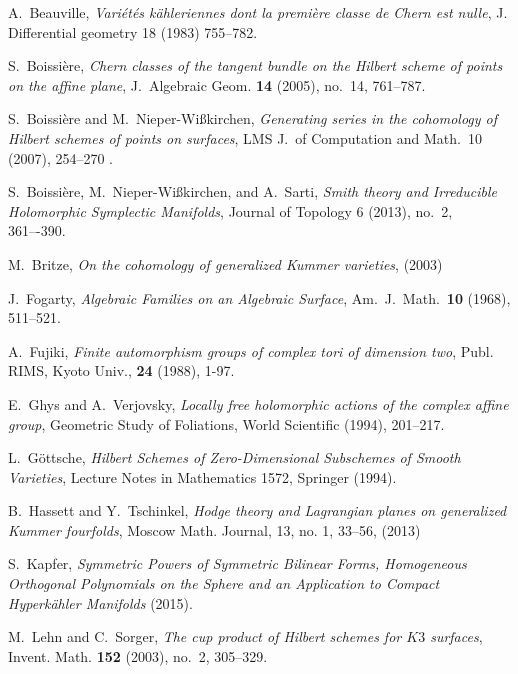 
\begin{thebibliography}{10}

A.~Beauville, \emph{Vari\'et\'es k\"ahleriennes dont la premi\`ere classe de Chern est nulle}, 
  J. Differential geometry 18 (1983) 755--782.

S.~Boissi\`ere, \emph{Chern classes of the tangent bundle on the Hilbert scheme of points
  on the affine plane}, J.~Algebraic Geom. \textbf{14} (2005), no.~14, 761--787.

S.~Boissi\`ere and M.~Nieper-Wi{\ss}kirchen, \emph{Generating series in the cohomology 
  of Hilbert schemes of points on surfaces}, LMS J.~of Computation and Math.~10 (2007), 254--270 .

S.~Boissi\`ere, M.~Nieper-Wi{\ss}kirchen, and A.~Sarti, \emph{Smith theory and 
  Irreducible Holomorphic Symplectic Manifolds}, Journal of Topology 6 (2013), no.~2, 361–-390.

M.~Britze, \emph{On the cohomology of generalized Kummer varieties}, (2003) 

J.~Fogarty, \emph{Algebraic Families on an Algebraic Surface},
  Am.~J.~Math.~\textbf{10} (1968), 511--521.

A.~Fujiki, \emph{Finite automorphism groups of complex tori of dimension two}, Publ. RIMS,
  Kyoto Univ., \textbf{24} (1988), 1-97.

E.~Ghys and A.~Verjovsky, \emph{Locally free holomorphic actions of the complex affine group},
  Geometric Study of Foliations, World Scientific (1994), 201--217.

L.~G\"ottsche, \emph{Hilbert Schemes of Zero-Dimensional Subschemes of Smooth Varieties},
  Lecture Notes in Mathematics 1572, Springer (1994).

B.~Hassett and Y.~Tschinkel, \emph{ Hodge theory and Lagrangian planes on 
  generalized Kummer fourfolds}, Moscow Math. Journal, 13, no. 1, 33--56, (2013) 
  
S.~Kapfer, \emph{Symmetric Powers of Symmetric Bilinear Forms, Homogeneous Orthogonal Polynomials 
  on the Sphere and an Application to Compact Hyperk\"ahler Manifolds} (2015).
  
M.~Lehn and C.~Sorger, \emph{The cup product of Hilbert schemes for {$K3$}
  surfaces}, Invent. Math. \textbf{152} (2003), no.~2, 305--329.


\end{thebibliography}
